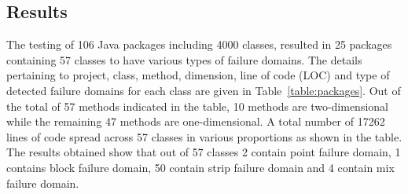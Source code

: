\documentclass[runningheads,a4paper]{llncs}
\begin{document}



\subsection{Results}
The testing of 106 Java packages including 4000 classes, resulted in 25 packages containing 57 classes to have various types of failure domains. The details pertaining to project, class, method, dimension, line of code (LOC) and type of detected failure domains for each class are given in Table~\ref{table:packages}. Out of the total of 57 methods indicated in the table, 10 methods are two-dimensional while the remaining 47 methods are one-dimensional. A total number of 17262 lines of code spread across 57 classes in various proportions as shown in the table. The results obtained show that out of 57 classes 2 contain point failure domain, 1 contains block failure domain, 50 contain strip failure domain and 4 contain mix failure domain. %
\end{document}
